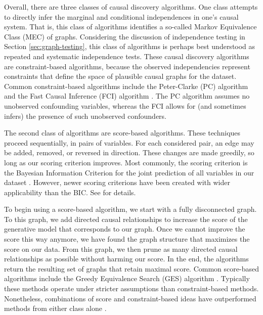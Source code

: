 Overall, there are three classes of causal discovery algorithms.
One class attempts to directly infer the marginal and conditional independences in one's causal system.
That is, this class of algorithms identifies a so-called Markov Equivalence Class (MEC) of graphs.
Considering the discussion of independence testing in Section \ref{sec:graph-testing}, this class of algorithms is perhaps best understood as repeated and systematic independence tests.
These causal discovery algorithms are constraint-based algorithms, because the observed independencies represent constraints that define the space of plausible causal graphs for the dataset.
Common constraint-based algorithms include the Peter-Clarke (PC) algorithm and the Fast Causal Inference (FCI) algorithm \citep{glymour_2001_causation}.
The PC algorithm assumes no unobserved confounding variables, whereas the FCI allows for (and sometimes infers) the presence of such unobserved confounders.

The second class of algorithms are score-based algorithms.
These techniques proceed sequentially, in pairs of variables.
For each considered pair, an edge may be added, removed, or reversed in direction.
These changes are made greedily, so long as our scoring criterion improves.
Most commonly, the scoring criterion is the Bayesian Information Criterion for the joint prediction of all variables in our dataset \citep{malinsky_2018_causal}.
However, newer scoring criterions have been created with wider applicability than the BIC.
See \citet{huang_2018_generalized} for details.

To begin using a score-based algorithm, we start with a fully disconnected graph.
To this graph, we add directed causal relationships to increase the score of the generative model that corresponds to our graph.
Once we cannot improve the score this way anymore, we have found the graph structure that maximizes the score on our data.
From this graph, we then prune as many directed causal relationships as possible without harming our score.
In the end, the algorithms return the resulting set of graphs that retain maximal score.
Common score-based algorithms include the Greedy Equivalence Search (GES) algorithm \citep{chickering_2002_optimal}.
Typically these methods operate under stricter assumptions than constraint-based methods.
Nonetheless, combinations of score and constraint-based ideas have outperformed methods from either class alone \citep{glymour_2019_review}.

